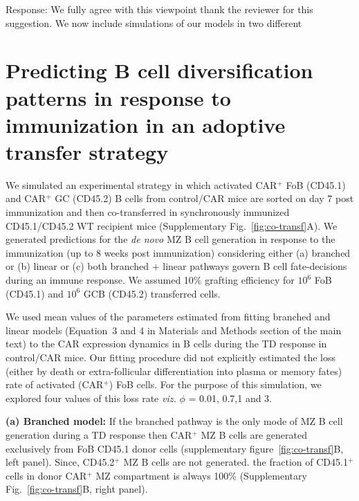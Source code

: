 \documentclass[11pt]{article}
\newcommand{\gray}[1]{{\color{gray}{#1}}}
\begin{document}
\gray{
3) In general, I believe that mathematical models should try to predict new features rather than just recapitulate existing data. Are there any new predictions for further experiments that the authors can propose, as this would increase the usefulness of the modeling section.
}

Response: We fully agree with this viewpoint thank the reviewer for this suggestion. 
We now include simulations of our models in two different 


\clearpage


\section*{Predicting B cell diversification patterns in response to immunization in an adoptive transfer strategy}

We simulated an experimental strategy in which activated CAR$^{+}$ FoB (CD45.1) and CAR$^{+}$ GC (CD45.2) B cells from control/CAR mice are sorted on day 7 post immunization and then co-transferred in synchronously immunized CD45.1/CD45.2 WT recipient mice (Supplementary Fig.~\ref{fig:co-transf}A).
We generated predictions for the \textit{de novo} MZ B cell generation in response to the immunization (up to 8 weeks post immunization) considering either (a) branched or (b) linear or (c) both branched + linear pathways govern B cell fate-decisions during an immune response.
We assumed 10\% grafting efficiency for $10^{6}$ FoB (CD45.1) and $10^{6}$ GCB (CD45.2) transferred cells. 

We used mean values of the parameters estimated from fitting branched and linear models (Equation~3 and 4 in Materials and Methods section of the main text) to the CAR expression dynamics in B cells during the TD response in control/CAR mice.
Our fitting procedure did not explicitly estimated the loss (either by death or extra-follicular differentiation into plasma or memory fates) rate of activated (CAR$^{+}$) FoB cells.
For the purpose of this simulation, we explored four values of this loss rate \textit{viz.} $\phi$ = 0.01, 0.7,1 and 3.


\textbf{(a) Branched model:}
If the branched pathway is the only mode of MZ B cell generation during a TD response then 
CAR$^{+}$  MZ B cells are generated exclusively from FoB CD45.1 donor cells (supplementary figure~\ref{fig:co-transf}B, left panel).
Since, CD45.2$^{+}$ MZ B cells are not generated.%
the fraction of CD45.1$^{+}$ cells in donor CAR$^{+}$ MZ compartment is always 100\% (Supplementary Fig.~\ref{fig:co-transf}B, right panel).
\end{document}
